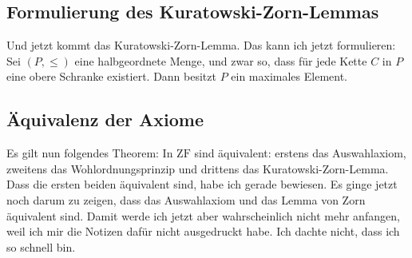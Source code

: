 \begin{math-stroke}

\end{math-stroke}

\subsection{Formulierung des Kuratowski-Zorn-Lemmas}

\begin{spoken-clean}[01:00:40 - 01:02:40]
Und jetzt kommt das Kuratowski-Zorn-Lemma. Das kann ich jetzt formulieren: Sei $(P, \le)$ eine halbgeordnete Menge, und zwar so, dass für jede Kette $C$ in $P$ eine obere Schranke existiert. Dann besitzt $P$ ein maximales Element.
\end{spoken-clean}

\begin{math-stroke}
\end{math-stroke}

\subsection{Äquivalenz der Axiome}

\begin{spoken-clean}[01:02:40 - 01:04:40]
Es gilt nun folgendes Theorem: In $\text{ZF}$ sind äquivalent: erstens das Auswahlaxiom, zweitens das Wohlordnungsprinzip und drittens das Kuratowski-Zorn-Lemma. Dass die ersten beiden äquivalent sind, habe ich gerade bewiesen. Es ginge jetzt noch darum zu zeigen, dass das Auswahlaxiom und das Lemma von Zorn äquivalent sind. Damit werde ich jetzt aber wahrscheinlich nicht mehr anfangen, weil ich mir die Notizen dafür nicht ausgedruckt habe. Ich dachte nicht, dass ich so schnell bin.
\end{spoken-clean}

